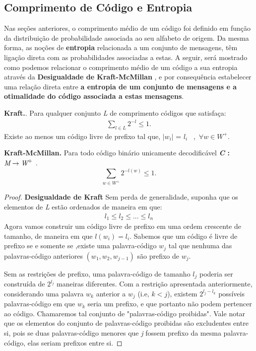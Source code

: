 \subsection{Comprimento de Código e Entropia}
Nas seções anteriores, o comprimento médio de um código  foi definido em função da distribuição de probabilidade associada ao seu alfabeto de origem.
Da mesma forma, as noções de \textbf{entropia} relacionada a um conjunto de mensagens, têm ligação direta com as probabilidades associadas a estas. 
A seguir, será mostrado como podemos relacionar o comprimento médio de um código a sua entropia através da \textbf{Desigualdade de Kraft-McMillan} , e por consequência estabelecer uma relação direta entre \textbf{a entropia de um conjunto de mensagens e a otimalidade do código associada a estas mensagens}.

\begin{lemma} 
\textbf{Kraft.}. Para qualquer conjunto \emph{L} de comprimento códigos que satisfaça:
\begin{align*}
\sum_{l \in L}^{} 2^{-l} \leq 1.
\end{align*}
Existe ao menos um código livre de prefixo tal que, $|w_i|$ = $l_i$ ~,~$\forall w \in W^+$.

\textbf{Kraft-McMillan.} Para todo código binário unicamente decodificável \textbf{\emph{C} : $\emph{M} \rightarrow \emph{W}^+$} .
\begin{equation*}
\sum_{w \in W^+}^{}2^{-l(w)} \leq 1.
\end{equation*}


\begin{proof}

\item \textbf{Desigualdade de Kraft}
Sem perda de generalidade, suponha que os elementos de \emph{L} estão ordenados de maneira em que:
\begin{align*}
l_1 \leq l_2 \leq ... \leq l_n
\end{align*}
Agora vamos construir um código livre de prefixo em uma ordem crescente de tamanho, de maneira em que $l(w_i) = l_i$. Sabemos que um código é livre de prefixo se e somente se ,existe uma palavra-código $w_j$  tal que nenhuma das palavras-código anteriores $(w_1, w_2, w_{j-1})$ são prefixo de $w_j$.

Sem as restrições de prefixo, uma palavra-código de tamanho $l_j$ poderia ser construída de $2^{l_j}$ maneiras diferentes. Com a restrição apresentada anteriormente, considerando uma palavra $w_k$ anterior a $w_j$ (i.e, $k < j$), existem $2^{l_j - l_k}$ possíveis palavras-código em que $w_k$ seria um prefixo, e que portanto não podem pertencer ao código. Chamaremos tal conjunto de "palavras-código proibidas". Vale notar que os elementos do conjunto de palavras-código proibidas são excludentes entre si, pois se duas palavras-código menores que \emph{j} fossem prefixo da mesma palavra-código, elas seriam prefixos entre si. 


\end{proof}
\end{lemma}
